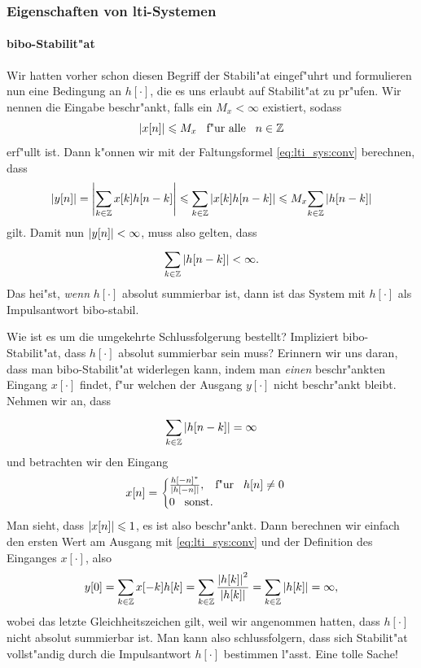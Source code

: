 \subsubsection{Eigenschaften von \texorpdfstring{\acrshort{lti}}{LTI}-Systemen}\label{sec:lti_sys:properties}
%
\paragraph{\texorpdfstring{\gls{bibo}}{BIBO}-Stabilit"at}
Wir hatten vorher schon diesen Begriff der Stabili"at eingef"uhrt und formulieren nun eine Bedingung an $h[\cdot]$, die es uns erlaubt auf Stabilit"at zu pr"ufen.
Wir nennen die Eingabe beschr"ankt, falls ein $M_x < \infty$ existiert, sodass
\[
{\left| x[n] \right|} \leqslant M_x {\hspace{3mm} \text{f"ur alle} \hspace{3mm}} n \in \mathbb{Z}
\]
erf"ullt ist.
Dann k"onnen wir mit der Faltungsformel \eqref{eq:lti_sys:conv} berechnen, dass
\[
{\left| y[n] \right|} 
    = {\left| {\sum\limits_{k\in\mathbb{Z}}^{}{x[k] h[n-k]}} \right|} 
    \leqslant {\sum\limits_{k\in\mathbb{Z}}^{}{{\left| x[k] h[n-k] \right|}}} 
    \leqslant M_x {\sum\limits_{k\in\mathbb{Z}}^{}{{\left| h[n-k] \right|}}} 
\]
gilt.
Damit nun ${\left| y[n] \right|} < \infty$, muss also gelten, dass
\[
    {\sum\limits_{k\in\mathbb{Z}}^{}{{\left| h[n-k] \right|}}} < \infty.
\]
Das hei"st, \emph{wenn} $h[\cdot]$ absolut summierbar ist, dann ist das System mit $h[\cdot]$ als Impulsantwort \gls{bibo}-stabil.

Wie ist es um die umgekehrte Schlussfolgerung bestellt?
Impliziert \gls{bibo}-Stabilit"at, dass $h[\cdot]$ absolut summierbar sein muss?
Erinnern wir uns daran, dass man \gls{bibo}-Stabilit"at widerlegen kann, indem man \emph{einen} beschr"ankten Eingang $x[\cdot]$ findet, f"ur welchen der Ausgang $y[\cdot]$ nicht beschr"ankt bleibt.
Nehmen wir an, dass 
\[
{\sum\limits_{k\in\mathbb{Z}}^{}{{\left| h[n-k] \right|}}} = \infty
\]
und betrachten wir den Eingang
\[
x[n] = \begin{cases}
    \frac{h[-n]^\ast}{{\left| h[-n] \right|}}, {\hspace{3mm} \text{f"ur} \hspace{3mm}} h[n] \neq 0 \\
    0 {\hspace{3mm} \text{sonst.} \hspace{3mm}}
\end{cases}
\]
Man sieht, dass ${\left| x[n] \right|} \leqslant 1$, es ist also beschr"ankt.
Dann berechnen wir einfach den ersten Wert am Ausgang mit \eqref{eq:lti_sys:conv} und der Definition des Einganges $x[\cdot]$, also
\[
y[0] 
    = {\sum\limits_{k\in\mathbb{Z}}^{}{x[-k] h[k]}}
    = {\sum\limits_{k\in\mathbb{Z}}^{}{
        \frac{{\left| h[k] \right|}^2}{{\left| h[k] \right|}}
    }}
    = {\sum\limits_{k\in\mathbb{Z}}^{}{
        {\left| h[k] \right|}
    }}
    = \infty,
\]
wobei das letzte Gleichheitszeichen gilt, weil wir angenommen hatten, dass $h[\cdot]$ nicht absolut summierbar ist.
Man kann also schlussfolgern, dass sich Stabilit"at vollst"andig durch die Impulsantwort $h[\cdot]$ bestimmen l"asst.
Eine tolle Sache!
%
